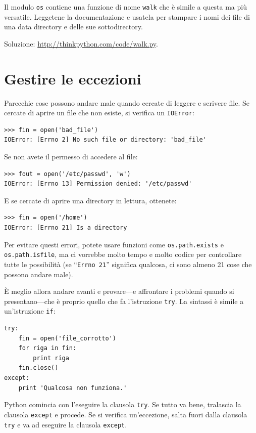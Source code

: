 \documentclass[10pt]{book}
\begin{document}
\vspace{0.2in}
\begin{exercise}

Il modulo {\tt os} contiene una funzione di nome {\tt walk}
che è simile a questa ma più versatile. Leggetene la documentazione e usatela per stampare i nomi dei file di una data directory e delle sue sottodirectory. 

Soluzione: \url{http://thinkpython.com/code/walk.py}.

\end{exercise}


\section{Gestire le eccezioni}
\label{catch}

Parecchie cose possono andare male quando cercate di leggere e scrivere  file. Se cercate di aprire un file che non esiste, si verifica un
{\tt IOError}:

\begin{verbatim}
>>> fin = open('bad_file')
IOError: [Errno 2] No such file or directory: 'bad_file'
\end{verbatim}
%
Se non avete il permesso di accedere al file:

\begin{verbatim}
>>> fout = open('/etc/passwd', 'w')
IOError: [Errno 13] Permission denied: '/etc/passwd'
\end{verbatim}
%
E se cercate di aprire una directory in lettura, ottenete:

\begin{verbatim}
>>> fin = open('/home')
IOError: [Errno 21] Is a directory
\end{verbatim}
%
Per evitare questi errori, potete usare funzioni come {\tt os.path.exists}
e {\tt os.path.isfile}, ma ci vorrebbe molto tempo e molto codice per controllare tutte le possibilità (se ``{\tt Errno 21}'' significa qualcosa, ci sono almeno 21 cose che possono andare male).

È meglio allora andare avanti e provare---e affrontare i problemi quando si presentano---che è proprio quello che fa l'istruzione {\tt try}. La sintassi è simile a un'istruzione {\tt if}:

\begin{verbatim}
try:    
    fin = open('file_corrotto')
    for riga in fin:
        print riga
    fin.close()
except:
    print 'Qualcosa non funziona.'
\end{verbatim}
%
Python comincia con l'eseguire la clausola {\tt try}.  Se tutto va bene, tralascia la clausola {\tt except} e procede. Se si verifica un'eccezione, salta fuori dalla clausola {\tt try} e va ad eseguire la clausola {\tt except}.
\end{document}
